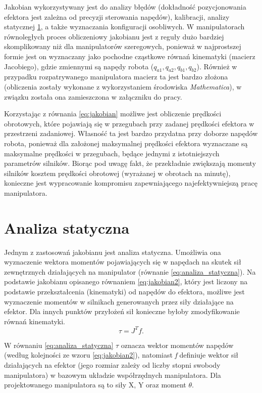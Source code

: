 \documentclass[printmode]{mgr}
\begin{document}
Jakobian wykorzystywany jest do analizy błędów (dokładność pozycjonowania efektora jest zależna od precyzji sterowania napędów),
kalibracji, analizy statycznej \ref{sec:analiza_statyczna}, a także wyznaczania konfiguracji osobliwych. W manipulatorach 
równoległych proces obliczeniowy jakobianu
jest z reguły dużo bardziej skomplikowany niż dla manipulatorów szeregowych, ponieważ w najprostszej formie jest on wyznaczany
jako pochodne cząstkowe równań kinematyki (macierz Jacobiego), gdzie zmiennymi są napędy robota ($q_{a1}, q_{a2}, q_{b1}, q_{b2}$). 
Również w przypadku rozpatrywanego manipulatora macierz ta jest bardzo złożona (obliczenia zostały wykonane z wykorzystaniem
środowiska \emph{Mathematica}), w związku została ona zamieszczona w załączniku do pracy.

Korzystając z równania \ref{eq:jakobian} możliwe jest obliczenie prędkości obrotowych, które pojawiają się w przegubach
przy zadanej prędkości efektora w przestrzeni zadaniowej. Własność ta jest bardzo przydatna przy doborze napędów robota,
ponieważ dla założonej maksymalnej prędkości efektora wyznaczane są maksymalne prędkości w przegubach, będące
jednymi z istotniejszych parametrów silników. Biorąc pod uwagę fakt, że przekładnie zwiększają momenty silników kosztem prędkości obrotowej
(wyrażanej w obrotach na minutę), konieczne jest wypracowanie kompromisu zapewniającego najefektywniejszą pracę manipulatora.

 

\section{Analiza statyczna}\label{sec:analiza_statyczna}
Jednym z zastosowań jakobianu jest analiza statyczna. Umożliwia ona wyznaczenie wektora momentów pojawiających się w napędach
na skutek sił zewnętrznych działających na manipulator (równanie \ref{eq:analiza_statyczna}). 
Na podstawie jakobianu opisanego równaniem \ref{eq:jakobian2}, który jest liczony
na podstawie przekształcenia (kinematyki) od napędów do efektora, możliwe jest wyznaczenie momentów w silnikach generowanych
przez siły działające na efektor. Dla innych punktów przyłożeń sił konieczne byłoby zmodyfikowanie równań kinematyki.
\begin{equation}
\tau=J^Tf.
\label{eq:analiza_statyczna}
\end{equation}

W równaniu \ref{eq:analiza_statyczna} \emph{$\tau$} oznacza wektor momentów napędów (według kolejności ze wzoru \ref{eq:jakobian2}), natomiast
\emph{f} definiuje wektor sił działających na efektor (jego rozmiar zależy od liczby stopni swobody manipulatora) w bazowym
układzie współrzędnych manipulatora. Dla projektowanego manipulatora są to siły X, Y oraz moment $\theta$.
\end{document}
